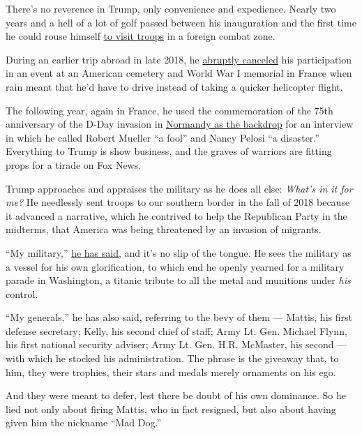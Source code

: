 There's no reverence in Trump, only convenience and expedience. Nearly
two years and a hell of a lot of golf passed between his inauguration
and the first time he could rouse himself
\href{https://www.nytimes.com/2018/12/26/us/politics/trump-iraq-troops-visit.html}{to
visit troops} in a foreign combat zone.

During an earlier trip abroad in late 2018, he
\href{https://www.politico.eu/article/donald-trump-rain-world-war-1-castigated-for-missing-event-paris-armistice/}{abruptly
canceled} his participation in an event at an American cemetery and
World War I memorial in France when rain meant that he'd have to drive
instead of taking a quicker helicopter flight.

The following year, again in France, he used the commemoration of the
75th anniversary of the D-Day invasion in
\href{https://www.nytimes.com/2019/06/06/world/europe/trump-france-dday.html}{Normandy
as the backdrop} for an interview in which he called Robert Mueller ``a
fool'' and Nancy Pelosi ``a disaster.'' Everything to Trump is show
business, and the graves of warriors are fitting props for a tirade on
Fox News.

Trump approaches and appraises the military as he does all else:
\emph{What's in it for me?} He needlessly sent troops to our southern
border in the fall of 2018 because it advanced a narrative, which he
contrived to help the Republican Party in the midterms, that America was
being threatened by an invasion of migrants.

``My military,''
\href{https://www.businessinsider.com/trump-my-generals-my-military-2017-10}{he
has said}, and it's no slip of the tongue. He sees the military as a
vessel for his own glorification, to which end he openly yearned for a
military parade in Washington, a titanic tribute to all the metal and
munitions under \emph{his} control.

``My generals,'' he has also said, referring to the bevy of them ---
Mattis, his first defense secretary; Kelly, his second chief of staff;
Army Lt. Gen. Michael Flynn, his first national security adviser; Army
Lt. Gen. H.R. McMaster, his second --- with which he stocked his
administration. The phrase is the giveaway that, to him, they were
trophies, their stars and medals merely ornaments on his ego.

And they were meant to defer, lest there be doubt of his own dominance.
So he lied not only about firing Mattis, who in fact resigned, but also
about having given him the nickname ``Mad Dog.''

